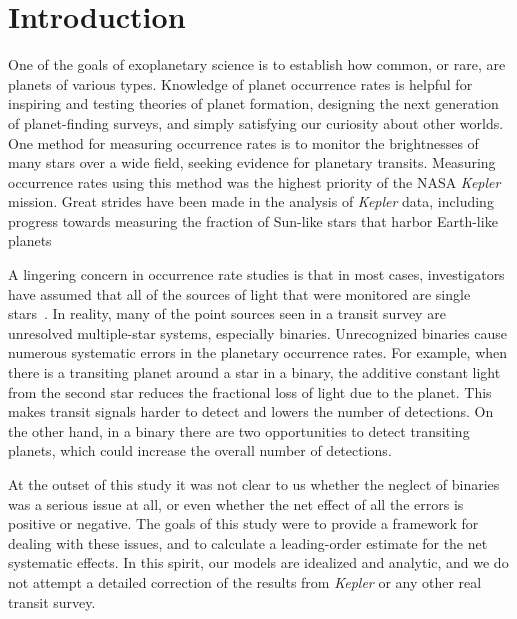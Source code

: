 \documentclass[12pt,modern]{aastex61}
\begin{document}
\section{Introduction}

One of the goals of exoplanetary science is to establish how common,
or rare, are planets of various types.  Knowledge of planet occurrence
rates is helpful for inspiring and testing theories of planet
formation, designing the next generation of planet-finding surveys,
and simply satisfying our curiosity about other worlds.  One method
for measuring occurrence rates is to monitor the brightnesses of many
stars over a wide field, seeking evidence for planetary transits.
Measuring occurrence rates using this method was the highest priority
of the NASA {\it Kepler} mission.  Great strides have been made in the
analysis of {\it Kepler} data, including progress towards measuring
the fraction of Sun-like stars that harbor Earth-like planets~\citep{
  youdin_exoplanet_2011,petigura_prevalence_2013,dong_fast_2013,
  foreman-mackey_exoplanet_2014,burke_terrestrial_2015}

A lingering concern in occurrence rate studies is that in most cases,
investigators have assumed that all of the sources of light that were
monitored are single stars~\citep[\textit{e.g.},][]{
  howard_planet_2012,fressin_false_2013,
  dressing_occurrence_2015,burke_terrestrial_2015}. 
In reality, many of the point sources seen in a transit survey are
unresolved multiple-star systems, especially binaries.  Unrecognized
binaries cause numerous systematic errors in the planetary occurrence
rates.  For example, when there is a transiting planet around a star
in a binary, the additive constant light from the second star reduces
the fractional loss of light due to the planet.  This makes transit
signals harder to detect and lowers the number of detections.  On the
other hand, in a binary there are two opportunities to detect
transiting planets, which could increase the overall number of
detections.

At the outset of this study it was not clear to us whether the neglect
of binaries was a serious issue at all, or even whether the net effect
of all the errors is positive or negative.  The goals of this study
were to provide a framework for dealing with these issues, and to
calculate a leading-order estimate for the net systematic effects.  In
this spirit, our models are idealized and analytic, and we do not
attempt a detailed correction of the results from {\it Kepler} or any
other real transit survey.  
\end{document}
